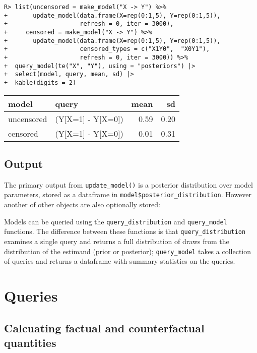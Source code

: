 \documentclass[
  11pt,
  article]{jss}
\begin{document}
\begin{verbatim}
R> list(uncensored = make_model("X -> Y") %>%
+       update_model(data.frame(X=rep(0:1,5), Y=rep(0:1,5)),
+                    refresh = 0, iter = 3000),
+     censored = make_model("X -> Y") %>%
+       update_model(data.frame(X=rep(0:1,5), Y=rep(0:1,5)),
+                    censored_types = c("X1Y0",  "X0Y1"),
+                    refresh = 0, iter = 3000)) %>%
+  query_model(te("X", "Y"), using = "posteriors") |>
+  select(model, query, mean, sd) |>
+  kable(digits = 2)
\end{verbatim}

\begin{tabular}{l|l|r|r}
\hline
model & query & mean & sd\\
\hline
uncensored & (Y[X=1] - Y[X=0]) & 0.59 & 0.20\\
\hline
censored & (Y[X=1] - Y[X=0]) & 0.01 & 0.31\\
\hline
\end{tabular}

\hypertarget{output}{%
\subsection{Output}\label{output}}

The primary output from \texttt{update\_model()} is a posterior
distribution over model parameters, stored as a dataframe in
\texttt{model\$posterior\_distribution}. However another of other
objects are also optionally stored:

Models can be queried using the \texttt{query\_distribution} and
\texttt{query\_model} functions. The difference between these functions
is that \texttt{query\_distribution} examines a single query and returns
a full distribution of draws from the distribution of the estimand
(prior or posterior); \texttt{query\_model} takes a collection of
queries and returns a dataframe with summary statistics on the queries.

\hypertarget{sec-query}{%
\section{Queries}\label{sec-query}}

\hypertarget{calcuating-factual-and-counterfactual-quantities}{%
\subsection{Calcuating factual and counterfactual
quantities}\label{calcuating-factual-and-counterfactual-quantities}}
\end{document}
